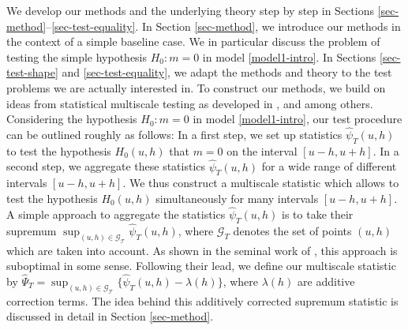 We develop our methods and the underlying theory step by step in Sections \ref{sec-method}--\ref{sec-test-equality}. In Section \ref{sec-method}, we introduce our methods in the context of a simple baseline case. We in particular discuss the problem of testing the simple hypothesis $H_0: m = 0$ in model \eqref{model1-intro}. In Sections \ref{sec-test-shape} and \ref{sec-test-equality}, we adapt the methods and theory to the test problems we are actually interested in. To construct our methods, we build on ideas from statistical multiscale testing as developed in \cite{ChaudhuriMarron1999,ChaudhuriMarron2000}, \cite{HallHeckman2000} and \cite{DuembgenSpokoiny2001} among others. Considering the hypothesis $H_0: m = 0$ in model \eqref{model1-intro}, our test procedure can be outlined roughly as follows: In a first step, we set up statistics $\widehat{\psi}_T(u,h)$ to test the hypothesis $H_0(u,h)$ that $m = 0$ on the interval $[u-h,u+h]$. In a second step, we aggregate these statistics $\widehat{\psi}_T(u,h)$ for a wide range of different intervals $[u-h,u+h]$. We thus construct a multiscale statistic which allows to test the hypothesis $H_0(u,h)$ simultaneously for many intervals $[u-h,u+h]$. A simple approach to aggregate the statistics $\widehat{\psi}_T(u,h)$ is to take their supremum $\sup_{(u,h) \in \mathcal{G_T}} \widehat{\psi}_T(u,h)$, where $\mathcal{G}_T$ denotes the set of points $(u,h)$ which are taken into account. As shown in the seminal work of \cite{DuembgenSpokoiny2001}, this approach is suboptimal in some sense. Following their lead, we define our multiscale statistic by $\widehat{\Psi}_T = \sup_{(u,h) \in \mathcal{G_T}} \{ \widehat{\psi}_T(u,h) - \lambda(h)\}$, where $\lambda(h)$ are additive correction terms. The idea behind this additively corrected supremum statistic is discussed in detail in Section \ref{sec-method}. 


